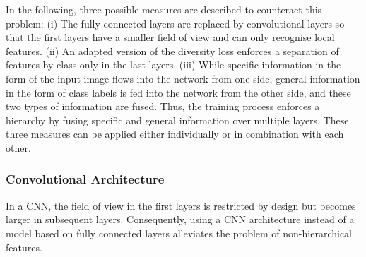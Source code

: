 In the following, three possible measures are described to counteract this problem: (i) The fully connected layers are replaced by convolutional layers so that the first layers have a smaller field of view and can only recognise local features. (ii) An adapted version of the diversity loss enforces a separation of features by class only in the last layers. (iii) While specific information in the form of the input image flows into the network from one side, general information in the form of class labels is fed into the network from the other side, and these two types of information are fused. Thus, the training process enforces a hierarchy by fusing specific and general information over multiple layers.
These three measures can be applied either individually or in combination with each other.


\subsubsection{Convolutional Architecture}
In a CNN, the field of view in the first layers is restricted by design but becomes larger in subsequent layers. Consequently, using a CNN architecture instead of a model based on fully connected layers alleviates the problem of non-hierarchical features.


